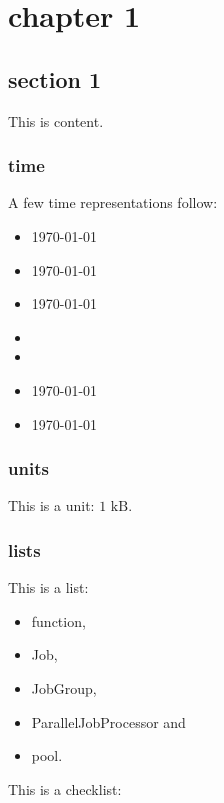 \chapter{chapter 1}
\label{chapter:chapter_1}
 
\section{section 1}
\label{section:section_1}

This is content.

\subsection{time}

A few time representations follow:

\begin{itemize}
\item \timeA\today
\item \timeB\today
\item \timeC\today
\item \timeD
\item \timeE
\item \timeF\today
\item \timeG\today
\end{itemize}

\subsection{units}

This is a unit: ${1\textrm{ kB}}$.

\subsection{lists}

This is a list:

\begin{itemize}
\item function,
\item Job,
\item JobGroup,
\item ParallelJobProcessor and
\item pool.
\end{itemize}

\newpage

This is a checklist:

